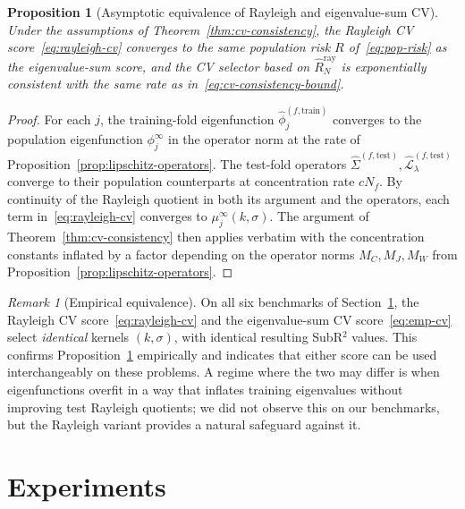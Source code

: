 \documentclass[11pt]{article}
\newtheorem{proposition}{Proposition}[section]
\theoremstyle{remark}
\newtheorem{remark}{Remark}[section]
\begin{document}
\begin{proposition}[Asymptotic equivalence of Rayleigh and eigenvalue-sum CV]
\label{prop:rayleigh-eigval-equiv}
Under the assumptions of Theorem~\ref{thm:cv-consistency}, the Rayleigh CV score~\eqref{eq:rayleigh-cv} converges to the same population risk $R$ of~\eqref{eq:pop-risk} as the eigenvalue-sum score, and the CV selector based on $\widehat{R}^{\mathrm{ray}}_N$ is exponentially consistent with the same rate as in~\eqref{eq:cv-consistency-bound}.
\end{proposition}

\begin{proof}
For each $j$, the training-fold eigenfunction $\widehat\phi_j^{(f,\mathrm{train})}$ converges to the population eigenfunction $\phi_j^\infty$ in the operator norm at the rate of Proposition~\ref{prop:lipschitz-operators}.
The test-fold operators $\widehat\Sigma^{(f,\mathrm{test})}, \widehat{\mathcal{L}}_\lambda^{(f,\mathrm{test})}$ converge to their population counterparts at concentration rate $c N_f$.
By continuity of the Rayleigh quotient in both its argument and the operators, each term in~\eqref{eq:rayleigh-cv} converges to $\mu_j^\infty(k,\sigma)$.
The argument of Theorem~\ref{thm:cv-consistency} then applies verbatim with the concentration constants inflated by a factor depending on the operator norms $M_C, M_J, M_W$ from Proposition~\ref{prop:lipschitz-operators}.
\end{proof}

\begin{remark}[Empirical equivalence]
On all six benchmarks of Section~\ref{sec:experiments}, the Rayleigh CV score~\eqref{eq:rayleigh-cv} and the eigenvalue-sum CV score~\eqref{eq:emp-cv} select \emph{identical} kernels $(k,\sigma)$, with identical resulting SubR$^2$ values.
This confirms Proposition~\ref{prop:rayleigh-eigval-equiv} empirically and indicates that either score can be used interchangeably on these problems.
A regime where the two may differ is when eigenfunctions overfit in a way that inflates training eigenvalues without improving test Rayleigh quotients; we did not observe this on our benchmarks, but the Rayleigh variant provides a natural safeguard against it.
\end{remark}


\section{Experiments}
\label{sec:experiments}
\end{document}
